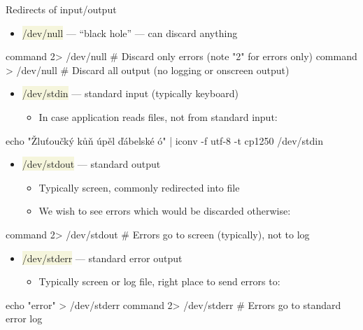 \documentclass[compress, ucs, xelatex, 11pt, xcolor=svgnames, aspectratio=169,
	hyperref={
		bookmarks=true,
		unicode=true,
		colorlinks=true,
		pdftitle={Linux, command line and MetaCentrum},
		plainpages=false,
		pdfauthor={Vojtech Zeisek},
		pdfsubject={Course about use of Linux command line, writing shell scripts and using MetaCentrum of CESNET},
		pdfcreator={XeLaTeX},
		pdfkeywords={Linux, GNU, BASH, shell, command line, MetaCentrum},
		linkcolor=DarkRed, %
		anchorcolor=DarkBlue, %
		citecolor=Indigo, %
		filecolor=NavyBlue, %
		menucolor=DarkMagenta, %
		urlcolor=DarkBlue, %
		pdftex},
	url={hyphens, lowtilde} %
	]{beamer}
\renewcommand{\texttt}[1]{\colorbox{Beige}{{\ttfamily #1}}}
\begin{document}
\begin{frame}[fragile]{Redirects of input/output}
	\label{pipe}
	\begin{itemize}
		\item \texttt{/dev/null} --- \enquote{black hole} --- can discard anything
	\end{itemize}
	\begin{bashcode}
    command 2> /dev/null # Discard only errors (note "2" for errors only)
    command > /dev/null # Discard all output (no logging or onscreen output)
	\end{bashcode}
	\begin{itemize}
		\item \texttt{/dev/stdin} --- standard input (typically keyboard)
		\begin{itemize}
			\item In case application reads files, not from standard input:
		\end{itemize}
	\end{itemize}
	\begin{bashcode}
    echo "Žluťoučký kůň úpěl ďábelské ó" | iconv -f utf-8 -t cp1250 /dev/stdin
	\end{bashcode}
	\begin{itemize}
		\item \texttt{/dev/stdout} --- standard output
		\begin{itemize}
			\item Typically screen, commonly redirected into file
			\item We wish to see errors which would be discarded otherwise:
		\end{itemize}
	\end{itemize}
	\begin{bashcode}
    command 2> /dev/stdout # Errors go to screen (typically), not to log
	\end{bashcode}
	\begin{itemize}
		\item \texttt{/dev/stderr} --- standard error output
		\begin{itemize}
			\item Typically screen or log file, right place to send errors to:
		\end{itemize}
	\end{itemize}
	\begin{bashcode}
    echo "error" > /dev/stderr
    command 2> /dev/stderr # Errors go to standard error log
	\end{bashcode}
\end{frame}
\end{document}
